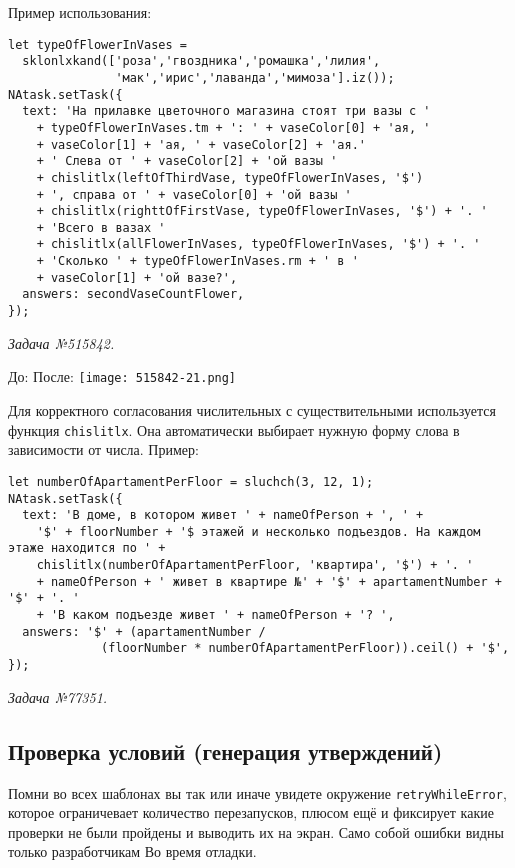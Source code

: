 Пример использования:
\begin{lstlisting}
let typeOfFlowerInVases =
  sklonlxkand(['роза','гвоздника','ромашка','лилия',
               'мак','ирис','лаванда','мимоза'].iz());
NAtask.setTask({
  text: 'На прилавке цветочного магазина стоят три вазы с '
    + typeOfFlowerInVases.tm + ': ' + vaseColor[0] + 'ая, '
    + vaseColor[1] + 'ая, ' + vaseColor[2] + 'ая.' 
    + ' Слева от ' + vaseColor[2] + 'ой вазы '
    + chislitlx(leftOfThirdVase, typeOfFlowerInVases, '$')
    + ', справа от ' + vaseColor[0] + 'ой вазы '
    + chislitlx(righttOfFirstVase, typeOfFlowerInVases, '$') + '. '
    + 'Всего в вазах '
    + chislitlx(allFlowerInVases, typeOfFlowerInVases, '$') + '. '
    + 'Сколько ' + typeOfFlowerInVases.rm + ' в '
    + vaseColor[1] + 'ой вазе?',
  answers: secondVaseCountFlower,
});
\end{lstlisting}
\textsl{Задача №515842.}

 
До:
После:
\texttt{[image: 515842-21.png]}    

Для корректного согласования числительных с существительными используется функция \texttt{chislitlx}. Она автоматически выбирает нужную форму слова в зависимости от числа.  
Пример:
\begin{lstlisting}
let numberOfApartamentPerFloor = sluchch(3, 12, 1);
NAtask.setTask({
  text: 'В доме, в котором живет ' + nameOfPerson + ', ' +
    '$' + floorNumber + '$ этажей и несколько подъездов. На каждом этаже находится по ' +
    chislitlx(numberOfApartamentPerFloor, 'квартира', '$') + '. '
    + nameOfPerson + ' живет в квартире №' + '$' + apartamentNumber + '$' + '. '
    + 'В каком подъезде живет ' + nameOfPerson + '? ',
  answers: '$' + (apartamentNumber /
             (floorNumber * numberOfApartamentPerFloor)).ceil() + '$',
});
\end{lstlisting}
\textsl{Задача №77351.}

\subsection{Проверка условий (генерация утверждений)}

Помни во всех шаблонах вы так или иначе увидете окружение \texttt{retryWhileError}, которое ограничевает количество перезапусков, плюсом ещё и фиксирует какие проверки не были пройдены и выводить их на экран. Само собой ошибки видны только разработчикам Во время отладки.


